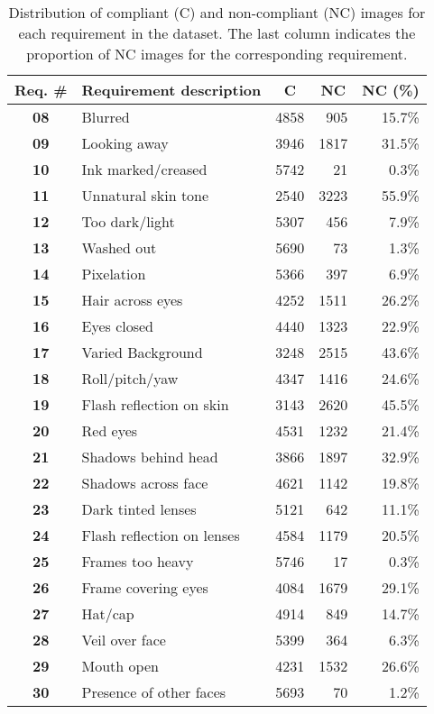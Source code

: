 \begin{table}[t]
\centering
\caption{Distribution of compliant (C) and non-compliant (NC) images for each requirement in the dataset. The last column indicates the proportion of NC images for the corresponding requirement.}
\label{tab:req-dist}
\begin{tabular}{clrrr}
\hline
\textbf{Req. \#} & \multicolumn{1}{c}{\textbf{Requirement description}} & \multicolumn{1}{c}{\textbf{C}} & \multicolumn{1}{c}{\textbf{NC}} & \multicolumn{1}{c}{\textbf{NC (\%)}} \\ \hline
\textbf{08} & Blurred & 4858 & 905 & 15.7\% \\
\textbf{09} & Looking away & 3946 & 1817 & 31.5\% \\
\textbf{10} & Ink marked/creased & 5742 & 21 & 0.3\% \\
\textbf{11} & Unnatural skin tone & 2540 & 3223 & 55.9\% \\
\textbf{12} & Too dark/light & 5307 & 456 & 7.9\% \\
\textbf{13} & Washed out & 5690 & 73 & 1.3\% \\
\textbf{14} & Pixelation & 5366 & 397 & 6.9\% \\
\textbf{15} & Hair across eyes & 4252 & 1511 & 26.2\% \\
\textbf{16} & Eyes closed & 4440 & 1323 & 22.9\% \\
\textbf{17} & Varied Background & 3248 & 2515 & 43.6\% \\
\textbf{18} & Roll/pitch/yaw & 4347 & 1416 & 24.6\% \\
\textbf{19} & Flash reflection on skin & 3143 & 2620 & 45.5\% \\
\textbf{20} & Red eyes & 4531 & 1232 & 21.4\% \\
\textbf{21} & Shadows behind head & 3866 & 1897 & 32.9\% \\
\textbf{22} & Shadows across face & 4621 & 1142 & 19.8\% \\
\textbf{23} & Dark tinted lenses & 5121 & 642 & 11.1\% \\
\textbf{24} & Flash reflection on lenses & 4584 & 1179 & 20.5\% \\
\textbf{25} & Frames too heavy & 5746 & 17 & 0.3\% \\
\textbf{26} & Frame covering eyes & 4084 & 1679 & 29.1\% \\
\textbf{27} & Hat/cap & 4914 & 849 & 14.7\% \\
\textbf{28} & Veil over face & 5399 & 364 & 6.3\% \\
\textbf{29} & Mouth open & 4231 & 1532 & 26.6\% \\
\textbf{30} & Presence of other faces & 5693 & 70 & 1.2\% \\ \hline
\end{tabular}%
\end{table}